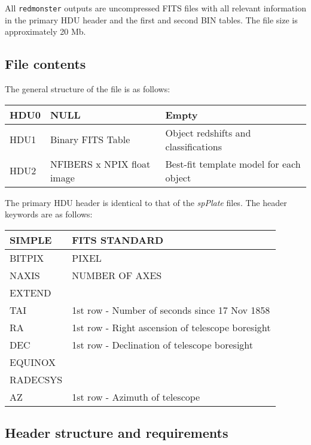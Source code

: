 \documentclass[12pt]{article}
\begin{document}
All \texttt{redmonster} outputs are uncompressed FITS
files with all relevant information in the primary HDU header and the first and second
BIN tables.  The file size is approximately 20 Mb.

\subsection{File contents}

The general structure of the file is as follows:

\begin{center}
	\begin{tabular}{ | l | l | l |}
	\hline
	HDU0 & NULL & Empty \\ \hline
	HDU1 & Binary FITS Table & Object redshifts and classifications \\ \hline
	HDU2 & NFIBERS x NPIX float image & Best-fit template model for each object \\
	\hline
	\end{tabular}
\end{center}

The primary HDU header is identical to that of the \textit{spPlate} files.
The header keywords are as follows:

\begin{center}
	\begin{tabular}{ | l | l | }
	\hline
	SIMPLE & FITS STANDARD \\ \hline
	BITPIX & PIXEL \\ \hline
	NAXIS & NUMBER OF AXES \\ \hline
	EXTEND & \\ \hline
	TAI & 1st row - Number of seconds since 17 Nov 1858 \\ \hline
	RA & 1st row - Right ascension of telescope boresight \\ \hline
	DEC & 1st row - Declination of telescope boresight \\ \hline
	EQUINOX & \\ \hline
	RADECSYS & \\ \hline
	AZ & 1st row - Azimuth of telescope \\
	\hline
	\end{tabular}
\end{center}


\subsection{Header structure and requirements}
\end{document}
